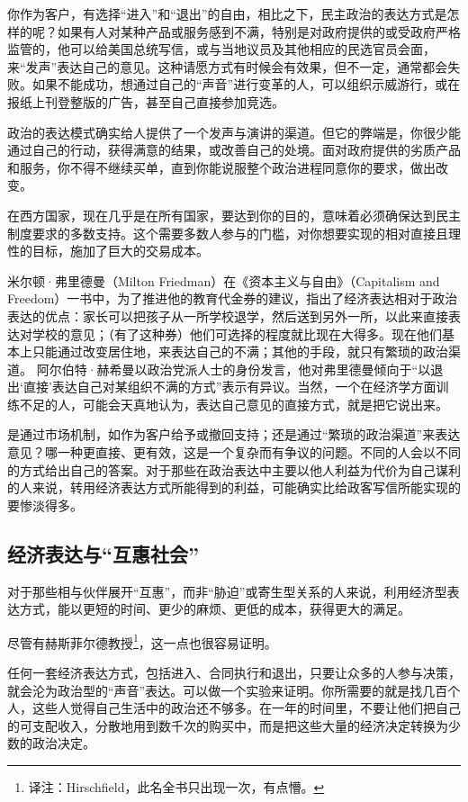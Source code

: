 你作为客户，有选择“进入”和“退出”的自由，相比之下，民主政治的表达方式是怎样的呢？如果有人对某种产品或服务感到不满，特别是对政府提供的或受政府严格监管的，他可以给美国总统写信，或与当地议员及其他相应的民选官员会面，来“发声”表达自己的意见。这种请愿方式有时候会有效果，但不一定，通常都会失败。如果不能成功，想通过自己的“声音”进行变革的人，可以组织示威游行，或在报纸上刊登整版的广告，甚至自己直接参加竞选。

政治的表达模式确实给人提供了一个发声与演讲的渠道。但它的弊端是，你很少能通过自己的行动，获得满意的结果，或改善自己的处境。面对政府提供的劣质产品和服务，你不得不继续买单，直到你能说服整个政治进程同意你的要求，做出改变。

在西方国家，现在几乎是在所有国家，要达到你的目的，意味着必须确保达到民主制度要求的多数支持。这个需要多数人参与的门槛，对你想要实现的相对直接且理性的目标，施加了巨大的交易成本。

米尔顿·弗里德曼（Milton Friedman）在《资本主义与自由》（Capitalism and Freedom）一书中，为了推进他的教育代金券的建议，指出了经济表达相对于政治表达的优点：家长可以把孩子从一所学校退学，然后送到另外一所，以此来直接表达对学校的意见；（有了这种券）他们可选择的程度就比现在大得多。现在他们基本上只能通过改变居住地，来表达自己的不满；其他的手段，就只有繁琐的政治渠道。 阿尔伯特·赫希曼以政治党派人士的身份发言，他对弗里德曼倾向于“以退出‘直接’表达自己对某组织不满的方式”表示有异议。当然，一个在经济学方面训练不足的人，可能会天真地认为，表达自己意见的直接方式，就是把它说出来。

是通过市场机制，如作为客户给予或撤回支持；还是通过“繁琐的政治渠道”来表达意见？哪一种更直接、更有效，这是一个复杂而有争议的问题。不同的人会以不同的方式给出自己的答案。对于那些在政治表达中主要以他人利益为代价为自己谋利的人来说，转用经济表达方式所能得到的利益，可能确实比给政客写信所能实现的要惨淡得多。

\subsection{经济表达与“互惠社会”}
对于那些相与伙伴展开“互惠”，而非“胁迫”或寄生型关系的人来说，利用经济型表达方式，能以更短的时间、更少的麻烦、更低的成本，获得更大的满足。

尽管有赫斯菲尔德教授\footnote{译注：Hirschfield，此名全书只出现一次，有点懵。}，这一点也很容易证明。

任何一套经济表达方式，包括进入、合同执行和退出，只要让众多的人参与决策，就会沦为政治型的“声音”表达。可以做一个实验来证明。你所需要的就是找几百个人，这些人觉得自己生活中的政治还不够多。在一年的时间里，不要让他们把自己的可支配收入，分散地用到数千次的购买中，而是把这些大量的经济决定转换为少数的政治决定。

